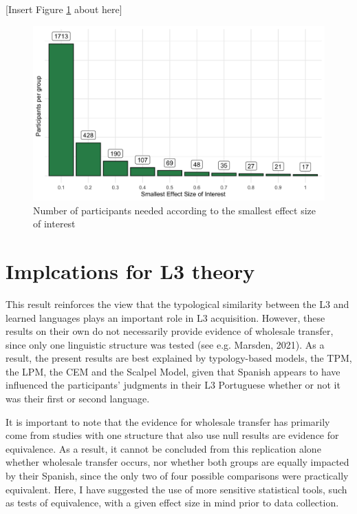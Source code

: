 \documentclass[
  man]{apa6}
\begin{document}
{[}Insert Figure \ref{fig:pc} about here{]}

\begin{figure}
\includegraphics[width=7.19in]{docs/figs/pc} \caption{Number of participants needed according to the smallest effect size of interest}\label{fig:pc}
\end{figure}

\hypertarget{implcations-for-l3-theory}{%
\section{Implcations for L3 theory}\label{implcations-for-l3-theory}}

This result reinforces the view that the typological similarity between the L3 and learned languages plays an important role in L3 acquisition.
However, these results on their own do not necessarily provide evidence of wholesale transfer, since only one linguistic structure was tested (see e.g. Marsden, 2021).
As a result, the present results are best explained by typology-based models, the TPM, the LPM, the CEM and the Scalpel Model, given that Spanish appears to have influenced the participants' judgments in their L3 Portuguese whether or not it was their first or second language.

It is important to note that the evidence for wholesale transfer has primarily come from studies with one structure that also use null results are evidence for equivalence.
As a result, it cannot be concluded from this replication alone whether wholesale transfer occurs, nor whether both groups are equally impacted by their Spanish, since the only two of four possible comparisons were practically equivalent.
Here, I have suggested the use of more sensitive statistical tools, such as tests of equivalence, with a given effect size in mind prior to data collection.
\end{document}
